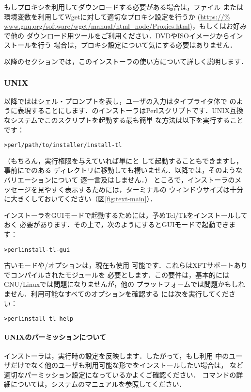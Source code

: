 \documentclass[uplatex,dvipdfmx,tombow]{jsarticle}
\begin{document}
もしプロキシを利用してダウンロードする必要がある場合は，ファイル
または環境変数を利用してWgetに対して適切なプロキシ設定を行うか (\url{https://%
www.gnu.org/software/wget/manual/html_node/Proxies.html})，もしくはお好みで他の
ダウンロード用ツールをご利用ください．DVDやISOイメージからインストールを行う
場合は，プロキシ設定について気にする必要はありません．

以降のセクションでは，このインストーラの使い方について詳しく説明します．

\subsubsection{UNIX}

以降では\code{>}はシェル・プロンプトを表し，ユーザの入力はタイプライタ体で
のように表現することにします．\TL のインストーラはPerlスクリプトです．UNIX互換なシステムでこのスクリプトを起動する最も簡単
な方法は以下を実行することです：
%
\begin{alltt}
> perl /path/to/installer/install-tl
\end{alltt}
%
（もちろん，実行権限を与えていれば単にと
して起動することもできますし，事前にでのある
ディレクトリに移動しても構いません．以降では，そのようなバリエーションについて
逐一言及はしません．）
%
ところで，インストーラのメッセージを見やすく表示するためには，ターミナルの
ウィンドウサイズは十分に大きくしておいてください（図\ref{fig:text-main}）．

インストーラをGUIモードで起動するためには，予めTcl/Tkをインストールしておく
必要があります．その上で，次のようにするとGUIモードで起動できます：
%
\begin{alltt}
> perl install-tl -gui
\end{alltt}

古いモードや/オプションは，現在も使用
可能です．これらはXFTサポートありでコンパイルされたモジュールを
必要とします．この要件は，基本的にはGNU/Linuxでは問題になりませんが，他の
プラットフォームでは問題かもしれません．利用可能なすべてのオプションを確認する
には次を実行してください：
%
\begin{alltt}
> perl install-tl -help
\end{alltt}

\paragraph{UNIXのパーミッションについて}
\TL インストーラは，実行時の設定を反映します．したがって，もし利用
中のユーザだけでなく他のユーザも利用可能な形で\TL をインストールしたい場合は，
など適切なパーミッション設定になっているかよくご確認ください．
コマンドの詳細については，システムのマニュアルを参照してください．
\end{document}
